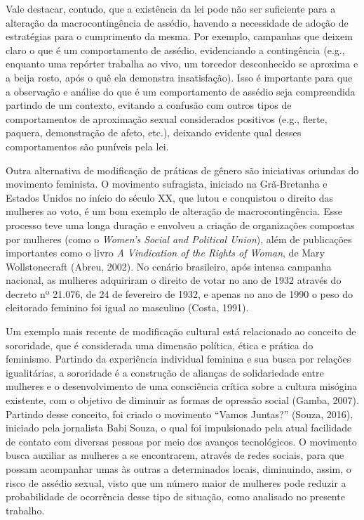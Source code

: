 Vale destacar, contudo, que a existência da lei pode não ser suficiente para a alteração da macrocontingência de assédio, havendo a necessidade de adoção de estratégias para o cumprimento da mesma. Por exemplo, campanhas que deixem claro o que é um comportamento de assédio, evidenciando a contingência (e.g., enquanto uma repórter trabalha ao vivo, um torcedor desconhecido se aproxima e a beija rosto, após o quê ela demonstra insatisfação). Isso é importante para que a observação e análise do que é um comportamento de assédio seja compreendida partindo de um contexto, evitando a confusão com outros tipos de comportamentos de aproximação sexual considerados positivos (e.g., flerte, paquera, demonstração de afeto, etc.), deixando evidente qual desses comportamentos são puníveis pela lei.

Outra alternativa de modificação de práticas de gênero são iniciativas oriundas do movimento feminista. O movimento sufragista, iniciado na Grã-Bretanha e Estados Unidos no início do século XX, que lutou e conquistou o direito das mulheres ao voto, é um bom exemplo de alteração de macrocontingência. Esse processo teve uma longa duração e envolveu a criação de organizações compostas por mulheres (como o \textit{Women’s Social and Political Union}), além de publicações importantes como o livro \textit{A Vindication of the Rights of Woman}, de Mary Wollstonecraft (Abreu, 2002). No cenário brasileiro, após intensa campanha nacional, as mulheres adquiriram o direito de votar no ano de 1932 através do decreto nº 21.076, de 24 de fevereiro de 1932, e apenas no ano de 1990 o peso do eleitorado feminino foi igual ao masculino (Costa, 1991).

Um exemplo mais recente de modificação cultural está relacionado ao conceito de sororidade, que é considerada uma dimensão política, ética e prática do feminismo. Partindo da experiência individual feminina e sua busca por relações igualitárias, a sororidade é a construção de alianças de solidariedade entre mulheres e o desenvolvimento de uma consciência crítica sobre a cultura misógina existente, com o objetivo de diminuir as formas de opressão social (Gamba, 2007). Partindo desse conceito, foi criado o movimento “Vamos Juntas?” (Souza, 2016), iniciado pela jornalista Babi Souza, o qual foi impulsionado pela atual facilidade de contato com diversas pessoas por meio dos avanços tecnológicos. O movimento busca auxiliar as mulheres a se encontrarem, através de redes sociais, para que possam acompanhar umas às outras a determinados locais, diminuindo, assim, o risco de assédio sexual, visto que um número maior de mulheres pode reduzir a probabilidade de ocorrência desse tipo de situação, como analisado no presente trabalho.

